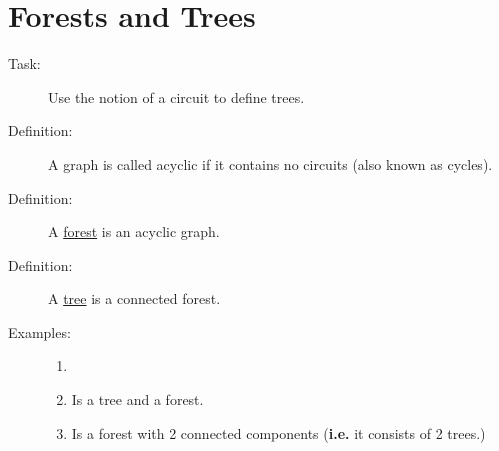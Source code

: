\documentclass[10pt]{article}
\begin{document}
	\section{Forests and Trees}
	\begin{description}
		\item[Task:] Use the notion of a circuit to define trees.
		\item[Definition:] A graph is called acyclic if it contains no circuits (also known as cycles).
		\item[Definition:] A \underline{forest} is an acyclic graph.
		\item[Definition:] A \underline{tree} is a connected forest.
		\item[Examples:]
		\begin{enumerate}
			\item[]
			\item Is a tree and a forest.
			\begin{figure}[h!]
				\centering
			\end{figure}
			\item Is a forest with 2 connected components (\textbf{i.e.} it consists of 2 trees.)
			\begin{figure}[h!]
				\centering
\end{figure}
\end{enumerate}
\end{description}
\end{document}
